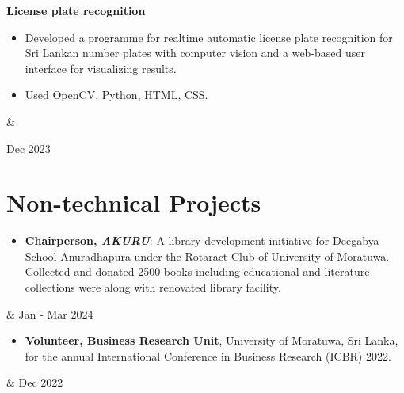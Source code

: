 \documentclass[10pt, a4paper]{article}
\newenvironment{highlights}{
        \begin{itemize}[
                topsep=0pt,
                parsep=0.10 cm,
                partopsep=0pt,
                itemsep=0pt,
                after=\vspace{-1\baselineskip},
                leftmargin=0.4 cm + 3pt
            ]
    }{
        \end{itemize}
    } %
\let\originalTabularx\tabularx
\let\originalEndTabularx\endtabularx
\renewenvironment{tabularx}{\bgroup\centering\originalTabularx}{\originalEndTabularx\par\egroup}
\begin{document}
        \vspace{0.2 cm}
        \begin{tabularx}{
            \textwidth-0.4 cm-0.13cm
        }{
            K{0.2 cm}
            R{4.1 cm}
        }
            \textbf{License plate recognition}

            \vspace{0.10 cm}

            \begin{highlights}
                \item Developed a programme for realtime automatic license plate recognition for Sri Lankan number plates with computer vision and a web-based user interface for visualizing results.
                \item Used OpenCV, Python, HTML, CSS.
            \end{highlights}
            &
            

            Dec 2023
        \end{tabularx}


        \vspace{0.2 cm}
        
        
	\section{Non-technical Projects}
	
	\begin{tabularx}{
            \textwidth-0.4 cm-0.13cm
        }{
            K{0.2 cm}
            R{4.1 cm}
        }
            \begin{highlights}
			\item \textbf{Chairperson, \textit{AKURU}}: A library development initiative for Deegabya School Anuradhapura under the Rotaract Club of University of Moratuwa. Collected and donated 2500 books including educational and literature collections were  along with renovated library facility. \end{highlights}
            &
            Jan - Mar 2024
        \end{tabularx}
	\begin{tabularx}{
            \textwidth-0.4 cm-0.13cm
        }{
            K{0.2 cm}
            R{4.1 cm}
        }
            \begin{highlights}
			\item \textbf{Volunteer, Business Research Unit}, University of Moratuwa, Sri Lanka, for the annual International Conference in Business Research (ICBR) 2022. \end{highlights}
            &
            Dec 2022
        \end{tabularx}
\end{document}
